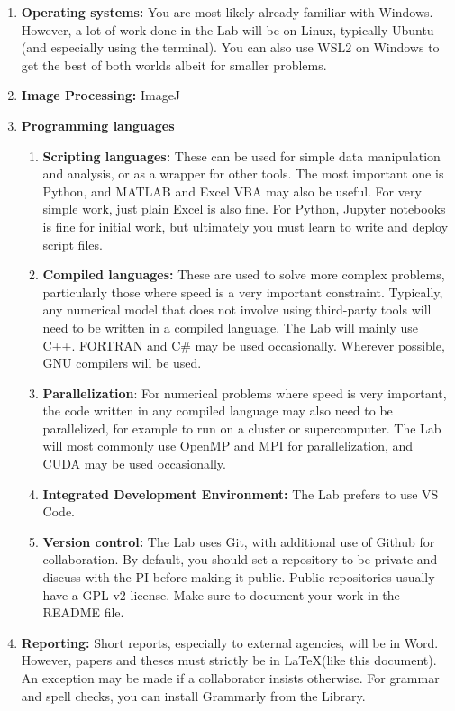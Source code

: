\documentclass[12pt]{article}
\begin{document}
\begin{enumerate}
	\item \textbf{Operating systems:} You are most likely already familiar with Windows. However, a lot of work done in the Lab will be on Linux, typically Ubuntu (and especially using the terminal). You can also use WSL2 on Windows to get the best of both worlds albeit for smaller problems.
	\item \textbf{Image Processing:} ImageJ
	\item \textbf{Programming languages}
	\begin{enumerate}
		\item \textbf{Scripting languages:} These can be used for simple data manipulation and analysis, or as a wrapper for other tools. The most important one is Python, and MATLAB and Excel VBA may also be useful. For very simple work, just plain Excel is also fine. For Python, Jupyter notebooks is fine for initial work, but ultimately you must learn to write and deploy script files.
		\item \textbf{Compiled languages:} These are used to solve more complex problems, particularly those where speed is a very important constraint. Typically, any numerical model that does not involve using third-party tools will need to be written in a compiled language. The Lab will mainly use C++. FORTRAN and C\# may be used occasionally. Wherever possible, GNU compilers will be used.
		\item \textbf{Parallelization}: For numerical problems where speed is very important, the code written in any compiled language may also need to be parallelized, for example to run on a cluster or supercomputer. The Lab will most commonly use OpenMP and MPI for parallelization, and CUDA may be used occasionally. 
		\item \textbf{Integrated Development Environment:} The Lab prefers to use VS Code.
		\item \textbf{Version control:} The Lab uses Git, with additional use of Github for collaboration. By default, you should set a repository to be private and discuss with the PI before making it public. Public repositories usually have a GPL v2 license. Make sure to document your work in the README file.
	\end{enumerate}
	\item \textbf{Reporting:} Short reports, especially to external agencies, will be in Word. However, papers and theses must strictly be in \LaTeX (like this document). An exception may be made if a collaborator insists otherwise. For grammar and spell checks, you can install Grammarly from the Library.

\end{enumerate}
\end{document}

